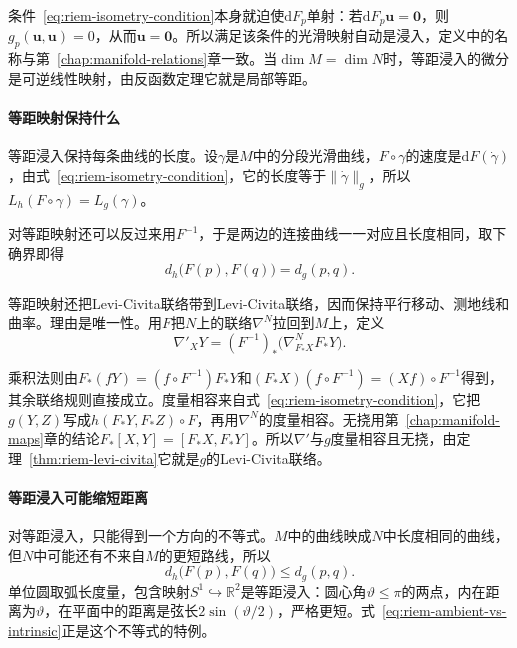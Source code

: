 条件~\eqref{eq:riem-isometry-condition}本身就迫使$\mathrm dF_p$单射：若$\mathrm dF_p\bm u=\bm 0$，则$g_p(\bm u,\bm u)=0$，从而$\bm u=\bm 0$。所以满足该条件的光滑映射自动是浸入，定义中的名称与第~\ref{chap:manifold-relations}章一致。当$\dim M=\dim N$时，等距浸入的微分是可逆线性映射，由反函数定理它就是局部等距。

\paragraph{等距映射保持什么}
等距浸入保持每条曲线的长度。设$\gamma$是$M$中的分段光滑曲线，$F\circ\gamma$的速度是$\mathrm dF(\dot\gamma)$，由式~\eqref{eq:riem-isometry-condition}，它的长度等于$\lVert\dot\gamma\rVert_g$，所以$L_h(F\circ\gamma)=L_g(\gamma)$。

对等距映射还可以反过来用$F^{-1}$，于是两边的连接曲线一一对应且长度相同，取下确界即得
\begin{equation}
d_h\bigl(F(p),F(q)\bigr)=d_g(p,q).
\label{eq:riem-isometry-distance}
\end{equation}

等距映射还把Levi-Civita联络带到Levi-Civita联络，因而保持平行移动、测地线和曲率。理由是唯一性。用$F$把$N$上的联络$\nabla^N$拉回到$M$上，定义
\[
\nabla'_XY=(F^{-1})_*\bigl(\nabla^N_{F_*X}F_*Y\bigr).
\]

乘积法则由$F_*(fY)=(f\circ F^{-1})F_*Y$和$(F_*X)(f\circ F^{-1})=(Xf)\circ F^{-1}$得到，其余联络规则直接成立。度量相容来自式~\eqref{eq:riem-isometry-condition}，它把$g(Y,Z)$写成$h(F_*Y,F_*Z)\circ F$，再用$\nabla^N$的度量相容。无挠用第~\ref{chap:manifold-maps}章的结论$F_*[X,Y]=[F_*X,F_*Y]$。所以$\nabla'$与$g$度量相容且无挠，由定理~\ref{thm:riem-levi-civita}它就是$g$的Levi-Civita联络。

\paragraph{等距浸入可能缩短距离}
对等距浸入，只能得到一个方向的不等式。$M$中的曲线映成$N$中长度相同的曲线，但$N$中可能还有不来自$M$的更短路线，所以
\begin{equation}
d_h\bigl(F(p),F(q)\bigr)\leq d_g(p,q).
\label{eq:riem-immersion-distance}
\end{equation}
单位圆取弧长度量，包含映射$S^1\hookrightarrow\mathbb R^2$是等距浸入：圆心角$\vartheta\leq\pi$的两点，内在距离为$\vartheta$，在平面中的距离是弦长$2\sin(\vartheta/2)$，严格更短。式~\eqref{eq:riem-ambient-vs-intrinsic}正是这个不等式的特例。

